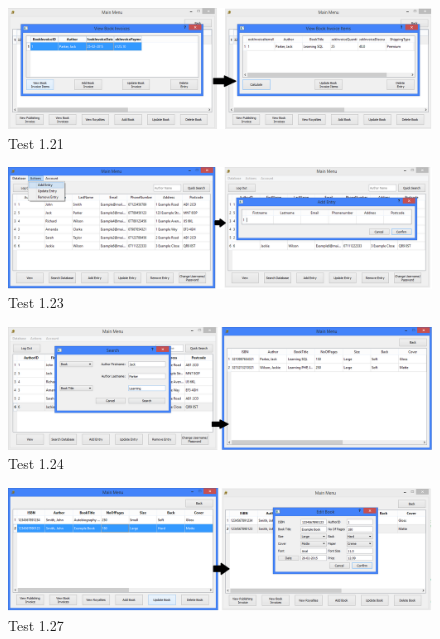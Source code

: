 \begin{landscape}
\begin{figure}[H]
    \includegraphics[width=\textwidth]{./Testing/Evidence/ViewBookInvoiceItemsButtonTest.png}
    \caption{Test 1.21}  \label{fig:ViewBookInvoiceItemsButtonTest}
\end{figure}

\begin{figure}[H]
    \includegraphics[width=\textwidth]{./Testing/Evidence/AddEntryMenuTest.png}
    \caption{Test 1.23}  \label{fig:AddEntryMenuTest}
\end{figure}

\begin{figure}[H]
    \includegraphics[width=\textwidth]{./Testing/Evidence/ConfirmSearchButtonTest.png}
    \caption{Test 1.24}  \label{fig:ConfirmSearchButtonTest}
\end{figure}

\begin{figure}[H]
    \includegraphics[width=\textwidth]{./Testing/Evidence/UpdateBookButtonTest.png}
    \caption{Test 1.27}  \label{fig:UpdateBookButtonTest}
\end{figure}


\end{landscape}
